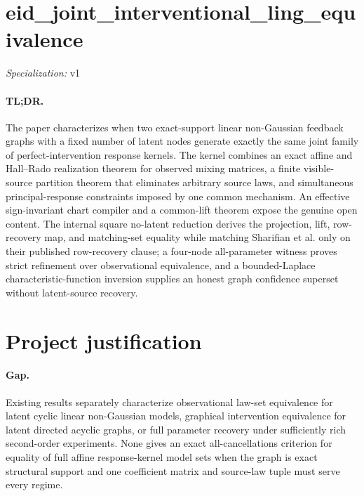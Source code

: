 \documentclass{article}
\begin{document}
\sloppy

\section*{eid\_\allowbreak{}joint\_\allowbreak{}interventional\_\allowbreak{}ling\_\allowbreak{}equivalence}

\noindent\textit{Specialization:} v1\par

\paragraph{TL;DR.} The paper characterizes when two exact-support linear non-Gaussian feedback graphs with a fixed number of latent nodes generate exactly the same joint family of perfect-intervention response kernels. The kernel combines an exact affine and Hall--Rado realization theorem for observed mixing matrices, a finite visible-source partition theorem that eliminates arbitrary source laws, and simultaneous principal-response constraints imposed by one common mechanism. An effective sign-invariant chart compiler and a common-lift theorem expose the genuine open content. The internal square no-latent reduction derives the projection, lift, row-recovery map, and matching-set equality while matching Sharifian et al. only on their published row-recovery clause; a four-node all-parameter witness proves strict refinement over observational equivalence, and a bounded-Laplace characteristic-function inversion supplies an honest graph confidence superset without latent-source recovery.

\section{Project justification}

\paragraph{Gap.} Existing results separately characterize observational law-set equivalence for latent cyclic linear non-Gaussian models, graphical intervention equivalence for latent directed acyclic graphs, or full parameter recovery under sufficiently rich second-order experiments. None gives an exact all-cancellations criterion for equality of full affine response-kernel model sets when the graph is exact structural support and one coefficient matrix and source-law tuple must serve every regime.
\end{document}
